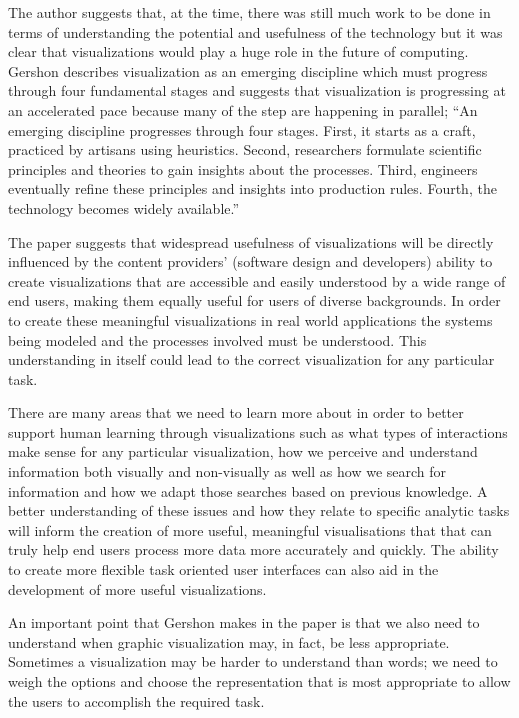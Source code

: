 \documentclass{sig-alternate}
\begin{document}
The author suggests that, at the time, there was still much work to be done in
terms of understanding the potential and usefulness of the technology but it was
clear that visualizations would play a huge role in the future of computing.
Gershon describes visualization as an emerging discipline which must progress
through four fundamental stages and suggests that visualization is progressing
at an accelerated pace because many of the step are happening in parallel; ``An
emerging discipline progresses through four stages. First, it starts as a craft,
practiced by artisans using heuristics. Second, researchers formulate scientific
principles and theories to gain insights about the processes. Third, engineers
eventually refine these principles and insights into production rules. Fourth,
the technology becomes widely available.''

The paper suggests that widespread usefulness of visualizations will be directly
influenced by the content providers' (software design and developers) ability to
create visualizations that are accessible and easily understood by a wide range
of end users, making them equally useful for users of diverse backgrounds. In
order to create these meaningful visualizations in real world applications the
systems being modeled and the processes involved must be understood. This
understanding in itself could lead to the correct visualization for any
particular task.

There are many areas that we need to learn more about in order to better support
human learning through visualizations such as what types of interactions make
sense for any particular visualization, how we perceive and understand
information both visually and non-visually as well as how we search for
information and how we adapt those searches based on previous knowledge. A
better understanding of these issues and how they relate to specific analytic
tasks will inform the creation of more useful, meaningful visualisations that
that can truly help end users process more data more accurately and quickly. The
ability to create more flexible task oriented user interfaces can also aid in
the development of more useful visualizations.

An important point that Gershon makes in the paper is that we also need to
understand when graphic visualization may, in fact, be less appropriate.
Sometimes a visualization may be harder to understand than words; we need to
weigh the options and choose the representation that is most appropriate to
allow the users to accomplish the required task.
\end{document}
